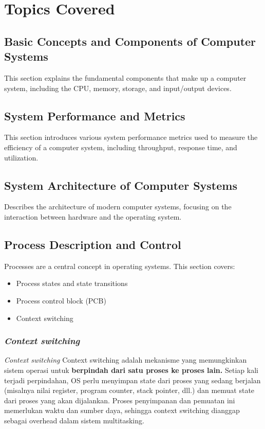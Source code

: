 \documentclass[12pt]{article}
\begin{document}
\section{Topics Covered}

\subsection{Basic Concepts and Components of Computer Systems}
This section explains the fundamental components that make up a computer system, including the CPU, memory, storage, and input/output devices.

\subsection{System Performance and Metrics}
This section introduces various system performance metrics used to measure the efficiency of a computer system, including throughput, response time, and utilization.

\subsection{System Architecture of Computer Systems}
Describes the architecture of modern computer systems, focusing on the interaction between hardware and the operating system.

\subsection{Process Description and Control}
Processes are a central concept in operating systems. This section covers:
\begin{itemize}
    \item Process states and state transitions
    \item Process control block (PCB)
    \item Context switching
\end{itemize}
\subsubsection{\textit{Context switching}}
 \textit{Context switching} Context switching adalah mekanisme yang memungkinkan sistem operasi untuk \textbf{berpindah dari satu proses ke proses lain.} Setiap kali terjadi perpindahan, OS perlu menyimpan state dari proses yang sedang berjalan (misalnya nilai register, program counter, stack pointer, dll.) dan memuat state dari proses yang akan dijalankan. Proses penyimpanan dan pemuatan ini memerlukan waktu dan sumber daya, sehingga context switching dianggap sebagai overhead dalam sistem multitasking. 
\end{document}
